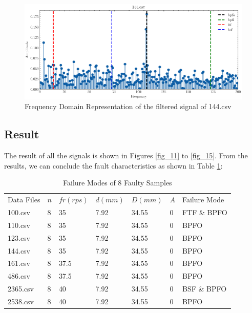 \documentclass[conference]{IEEEtran}
\begin{document}
\begin{figure}[htbp]
    \centerline{\includegraphics[width=\textwidth]{figure/fig_7.png}}
    \caption{Frequency Domain Representation of the filtered signal of 144.csv}
    \label{fig_7}
\end{figure}

\subsection{Result}

The result of all the signals is shown in Figures \ref{fig_11} to \ref{fig_15}. From the results, we can conclude the fault characteristics as shown in Table \ref{result}:

\begin{table}[htbp]
\caption{Failure Modes of 8 Faulty Samples}
\begin{tabular}{lllllll}
Data Files & $n$ & $fr(rps)$ & $d(mm)$ & $D(mm)$ & $A$ & Failure Mode \\
100.csv    & 8   & 35        & 7.92    & 34.55   & 0   & FTF \& BPFO  \\
110.csv    & 8   & 35        & 7.92    & 34.55   & 0   & BPFO         \\
123.csv    & 8   & 35        & 7.92    & 34.55   & 0   & BPFO         \\
144.csv    & 8   & 35        & 7.92    & 34.55   & 0   & BPFO         \\
161.csv    & 8   & 37.5      & 7.92    & 34.55   & 0   & BPFO         \\
486.csv    & 8   & 37.5      & 7.92    & 34.55   & 0   & BPFO         \\
2365.csv   & 8   & 40        & 7.92    & 34.55   & 0   & BSF \& BPFO  \\
2538.csv   & 8   & 40        & 7.92    & 34.55   & 0   & BPFO        
\end{tabular}
\label{result}
\end{table}
\end{document}
